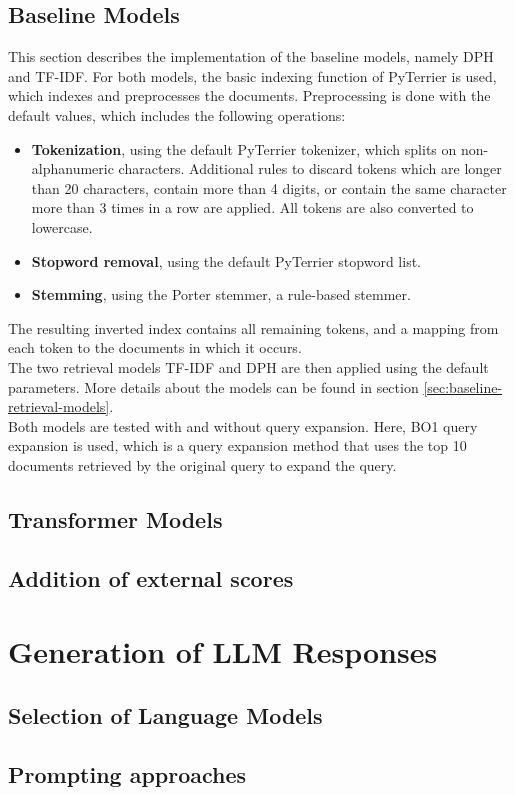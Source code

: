 \subsection{Baseline Models}
This section describes the implementation of the baseline models, namely DPH and TF-IDF.
For both models, the basic indexing function of PyTerrier is used, which indexes and preprocesses the documents.
Preprocessing is done with the default values, which includes the following operations:
\begin{itemize}
    \item{\textbf{Tokenization}, using the default PyTerrier tokenizer, which splits on non-alphanumeric characters. Additional rules to discard tokens which are longer than 20 characters, contain more than 4 digits, or contain the same character more than 3 times in a row are applied. All tokens are also converted to lowercase.}
    \item \textbf{Stopword removal}, using the default PyTerrier stopword list.
    \item \textbf{Stemming}, using the Porter stemmer, a rule-based stemmer.
\end{itemize}
The resulting inverted index contains all remaining tokens, and a mapping from each token to the documents in which it occurs.
\\
The two retrieval models TF-IDF and DPH are then applied using the default parameters.
More details about the models can be found in section \ref{sec:baseline-retrieval-models}.
\\
Both models are tested with and without query expansion.
Here, BO1 query expansion is used, which is a query expansion method that uses the top 10 documents retrieved by the original query to expand the query.


\subsection{Transformer Models}

\subsection{Addition of external scores}

\section{Generation of LLM Responses}


\subsection{Selection of Language Models}

\subsection{Prompting approaches}
